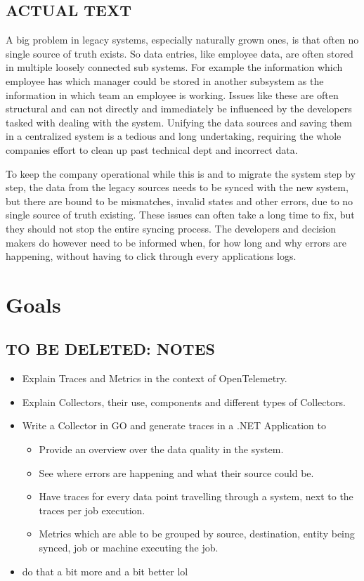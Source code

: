 \subsection{ACTUAL TEXT}

A big problem in legacy systems, especially naturally grown ones, is that often no single source of truth exists.
So data entries, like employee data, are often stored in multiple loosely connected sub systems.
For example the information which employee has which manager could be stored in another subsystem
as the information in which team an employee is working. Issues like these are often structural
and can not directly and immediately be influenced by the developers tasked with dealing with the system.
Unifying the data sources and saving them in a centralized system is a tedious and long undertaking,
requiring the whole companies effort to clean up past technical dept and incorrect data.

To keep the company operational while this is and to migrate the system step by step, 
the data from the legacy sources needs to be synced with the new system, but there are bound to be mismatches, 
invalid states and other errors, due to no single source of truth existing.
These issues can often take a long time to fix, but they should not stop the entire syncing process.
The developers and decision makers do however need to be informed when, for how long and why errors are happening,
without having to click through every applications logs.

\section{Goals}

\subsection{TO BE DELETED: NOTES}

\begin{itemize}
	\item Explain Traces and Metrics in the context of OpenTelemetry.
	\item Explain Collectors, their use, components and different types of Collectors.
	\item Write a Collector in GO and generate traces in a .NET Application to
	      \begin{itemize}
		      \item Provide an overview over the data quality in the system.
		      \item See where errors are happening and what their source could be.
		      \item Have traces for every data point travelling through a system, next to the traces per job execution.
		      \item Metrics which are able to be grouped by source, destination, entity being synced, job or machine executing the job.
	      \end{itemize}
	\item do that a bit more and a bit better lol
\end{itemize}

